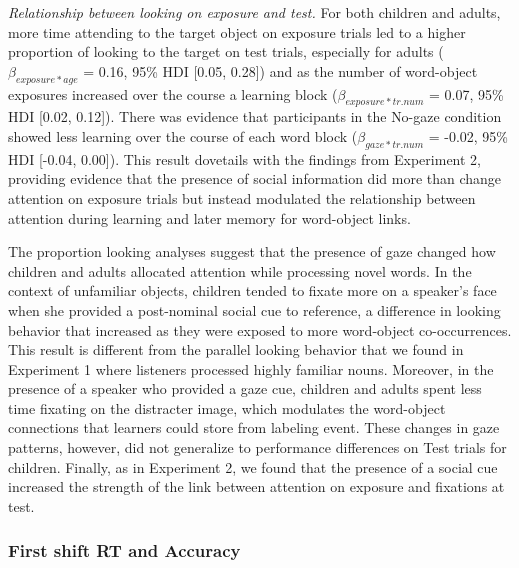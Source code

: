 \documentclass[10pt, letterpaper]{article}
\begin{document}
\emph{Relationship between looking on exposure and test.} For both
children and adults, more time attending to the target object on
exposure trials led to a higher proportion of looking to the target on
test trials, especially for adults (\(\beta_{exposure*age}\) = 0.16,
95\% HDI {[}0.05, 0.28{]}) and as the number of word-object exposures
increased over the course a learning block (\(\beta_{exposure*tr.num}\)
= 0.07, 95\% HDI {[}0.02, 0.12{]}). There was evidence that participants
in the No-gaze condition showed less learning over the course of each
word block (\(\beta_{gaze*tr.num}\) = -0.02, 95\% HDI {[}-0.04,
0.00{]}). This result dovetails with the findings from Experiment 2,
providing evidence that the presence of social information did more than
change attention on exposure trials but instead modulated the
relationship between attention during learning and later memory for
word-object links.

The proportion looking analyses suggest that the presence of gaze
changed how children and adults allocated attention while processing
novel words. In the context of unfamiliar objects, children tended to
fixate more on a speaker's face when she provided a post-nominal social
cue to reference, a difference in looking behavior that increased as
they were exposed to more word-object co-occurrences. This result is
different from the parallel looking behavior that we found in Experiment
1 where listeners processed highly familiar nouns. Moreover, in the
presence of a speaker who provided a gaze cue, children and adults spent
less time fixating on the distracter image, which modulates the
word-object connections that learners could store from labeling event.
These changes in gaze patterns, however, did not generalize to
performance differences on Test trials for children. Finally, as in
Experiment 2, we found that the presence of a social cue increased the
strength of the link between attention on exposure and fixations at
test.

\hypertarget{first-shift-rt-and-accuracy}{%
\subsubsection{First shift RT and
Accuracy}\label{first-shift-rt-and-accuracy}}
\end{document}
